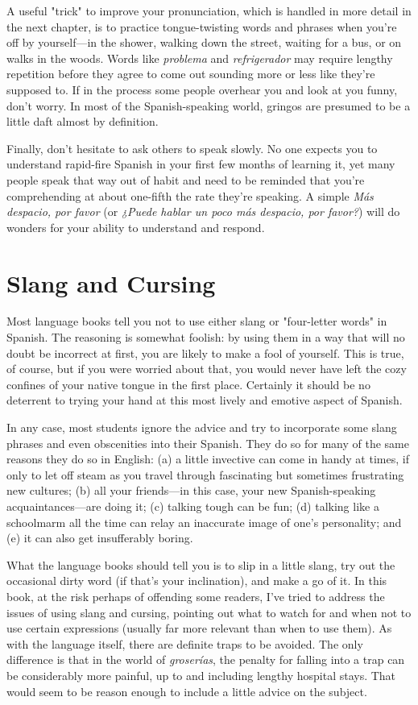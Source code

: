 A useful "trick" to improve your pronunciation, which is
handled in more detail in the next chapter, is to practice tongue-twisting words and phrases when you're off by yourself---in the
shower, walking down the street, waiting for a bus, or on walks in the
woods. Words like \emph{problema} and \emph{refrigerador} may require lengthy
repetition before they agree to come out sounding more or less like
they're supposed to. If in the process some people overhear you and
look at you funny, don't worry. In most of the Spanish-speaking world,
gringos are presumed to be a little daft almost by definition.

Finally, don't hesitate to ask others to speak slowly. No one
expects you to understand rapid-fire Spanish in your first few months
of learning it, yet many people speak that way out of habit and need to
be reminded that you're comprehending at about one-fifth the rate
they're speaking. A simple \emph{Más despacio, por favor} (or \emph{¿Puede hablar
un poco más despacio, por favor?}) will do wonders for your ability to
understand and respond.

\section{Slang and Cursing}

Most language books tell you not to use either slang or "four-letter words" in Spanish. The reasoning is somewhat foolish: by using
them in a way that will no doubt be incorrect at first, you are likely to
make a fool of yourself. This is true, of course, but if you were worried
about that, you would never have left the cozy confines of your native
tongue in the first place. Certainly it should be no deterrent to trying
your hand at this most lively and emotive aspect of Spanish.

In any case, most students ignore the advice and try to incorporate some slang phrases and even obscenities into their Spanish.
They do so for many of the same reasons they do so in English: (a) a
little invective can come in handy at times, if only to let off steam as
you travel through fascinating but sometimes frustrating new cultures;
(b) all your friends---in this case, your new Spanish-speaking acquaintances---are doing it; (c) talking tough can be fun; (d) talking like a
schoolmarm all the time can relay an inaccurate image of one's personality; and (e) it can also get insufferably boring.

What the language books should tell you is to slip in a little
slang, try out the occasional dirty word (if that's your inclination), and
make a go of it. In this book, at the risk perhaps of offending some
readers, I've tried to address the issues of using slang and cursing,
pointing out what to watch for and when not to use certain expressions (usually far more relevant than when to use them). As with the
language itself, there are definite traps to be avoided. The only difference is that in the world of \emph{groserías}, the penalty for falling into a trap
can be considerably more painful, up to and including lengthy hospital
stays. That would seem to be reason enough to include a little advice
on the subject.

